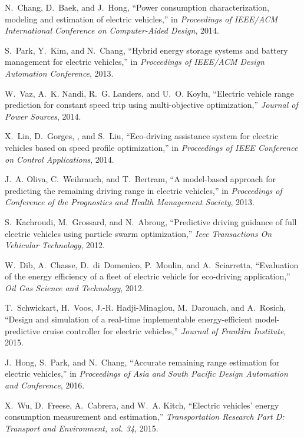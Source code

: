

N.~Chang, D.~Baek, and J.~Hong, ``Power consumption characterization, modeling
  and estimation of electric vehicles,'' in {\em Proceedings of IEEE/ACM
  International Conference on Computer-Aided Design}, 2014.

S.~Park, Y.~Kim, and N.~Chang, ``Hybrid energy storage systems and battery
  management for electric vehicles,'' in {\em Proceedings of IEEE/ACM Design
  Automation Conference}, 2013.

W.~Vaz, A.~K. Nandi, R.~G. Landers, and U.~O. Koylu, ``Electric vehicle range
  prediction for constant speed trip using multi-objective optimization,'' {\em
  Journal of Power Sources}, 2014.

X.~Lin, D.~Gorges, , and S.~Liu, ``Eco-driving assistance system for electric
  vehicles based on speed profile optimization,'' in {\em Proceedings of IEEE
  Conference on Control Applications}, 2014.

J.~A. Oliva, C.~Weihrauch, and T.~Bertram, ``A model-based approach for
  predicting the remaining driving range in electric vehicles,'' in {\em
  Proceedings of Conference of the Prognostics and Health Management Society},
  2013.

S.~Kachroudi, M.~Grossard, and N.~Abroug, ``Predictive driving guidance of full
  electric vehicles using particle swarm optimization,'' {\em Ieee Transactions
  On Vehicular Technology}, 2012.

W.~Dib, A.~Chasse, D.~di~Domenico, P.~Moulin, and A.~Sciarretta, ``Evaluation
  of the energy efficiency of a fleet of electric vehicle for eco-driving
  application,'' {\em Oil Gas Science and Technology}, 2012.

T.~Schwickart, H.~Voos, J.-R. Hadji-Minaglou, M.~Darouach, and A.~Rosich,
  ``Design and simulation of a real-time implementable energy-efficient
  model-predictive cruise controller for electric vehicles,'' {\em Journal of
  Franklin Institute}, 2015.

J.~Hong, S.~Park, and N.~Chang, ``Accurate remaining range estimation for
  electric vehicles,'' in {\em Proceedings of Asia and South Pacific Design
  Automation and Conference}, 2016.

X.~Wu, D.~Freese, A.~Cabrera, and W.~A. Kitch, ``Electric vehicles’ energy
  consumption measurement and estimation,'' {\em Transportation Research Part
  D: Transport and Environment, vol. 34}, 2015.

